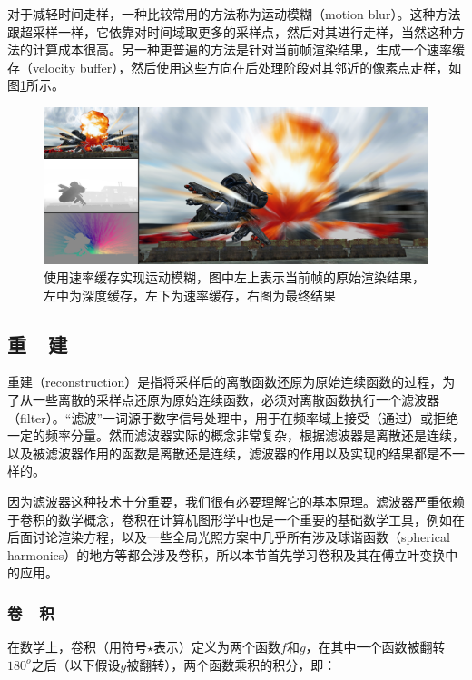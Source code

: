 对于减轻时间走样，一种比较常用的方法称为运动模糊（motion blur）。这种方法跟超采样一样，它依靠对时间域取更多的采样点，然后对其进行走样，当然这种方法的计算成本很高。另一种更普遍的方法是针对当前帧渲染结果，生成一个速率缓存（velocity buffer）\cite{a:AReconstructionFilterforPlausibleMotionBlur}，然后使用这些方向在后处理阶段对其邻近的像素点走样，如图\ref{f:intro-motion-blur}所示。

\begin{figure}
	\includegraphics[width=1.\textwidth]{figures/intro/motion-blur}
	\caption{使用速率缓存实现运动模糊，图中左上表示当前帧的原始渲染结果，左中为深度缓存，左下为速率缓存，右图为最终结果}
	\label{f:intro-motion-blur}
\end{figure}



\subsection{重~~建}\label{sec:intro-reconstruction}
重建（reconstruction）是指将采样后的离散函数还原为原始连续函数的过程，为了从一些离散的采样点还原为原始连续函数，必须对离散函数执行一个滤波器（filter）。“滤波”一词源于数字信号处理中，用于在频率域上接受（通过）或拒绝一定的频率分量。然而滤波器实际的概念非常复杂，根据滤波器是离散还是连续，以及被滤波器作用的函数是离散还是连续，滤波器的作用以及实现的结果都是不一样的。

因为滤波器这种技术十分重要，我们很有必要理解它的基本原理。滤波器严重依赖于卷积的数学概念，卷积在计算机图形学中也是一个重要的基础数学工具，例如在后面讨论渲染方程，以及一些全局光照方案中几乎所有涉及球谐函数（spherical harmonics）的地方等都会涉及卷积，所以本节首先学习卷积及其在傅立叶变换中的应用。



\subsubsection{卷~~积}
在数学上，卷积（用符号$\star$表示）定义为两个函数$f$和$g$，在其中一个函数被翻转$180^{o}$之后（以下假设$g$被翻转），两个函数乘积的积分，即：

